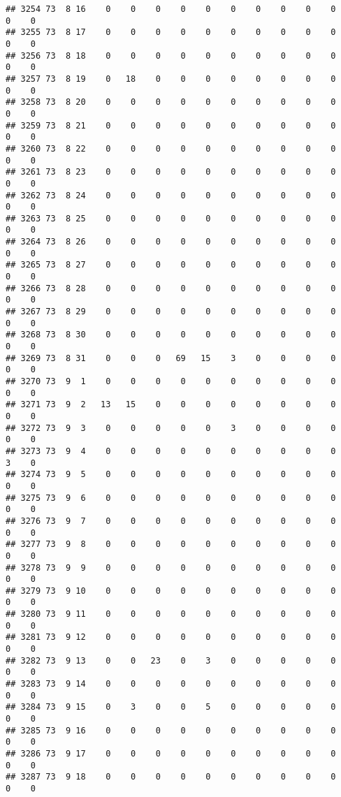 \documentclass[]{article}
\begin{document}
\begin{verbatim}
## 3254 73  8 16    0    0    0    0    0    0    0    0    0    0    0    0
## 3255 73  8 17    0    0    0    0    0    0    0    0    0    0    0    0
## 3256 73  8 18    0    0    0    0    0    0    0    0    0    0    0    0
## 3257 73  8 19    0   18    0    0    0    0    0    0    0    0    0    0
## 3258 73  8 20    0    0    0    0    0    0    0    0    0    0    0    0
## 3259 73  8 21    0    0    0    0    0    0    0    0    0    0    0    0
## 3260 73  8 22    0    0    0    0    0    0    0    0    0    0    0    0
## 3261 73  8 23    0    0    0    0    0    0    0    0    0    0    0    0
## 3262 73  8 24    0    0    0    0    0    0    0    0    0    0    0    0
## 3263 73  8 25    0    0    0    0    0    0    0    0    0    0    0    0
## 3264 73  8 26    0    0    0    0    0    0    0    0    0    0    0    0
## 3265 73  8 27    0    0    0    0    0    0    0    0    0    0    0    0
## 3266 73  8 28    0    0    0    0    0    0    0    0    0    0    0    0
## 3267 73  8 29    0    0    0    0    0    0    0    0    0    0    0    0
## 3268 73  8 30    0    0    0    0    0    0    0    0    0    0    0    0
## 3269 73  8 31    0    0    0   69   15    3    0    0    0    0    0    0
## 3270 73  9  1    0    0    0    0    0    0    0    0    0    0    0    0
## 3271 73  9  2   13   15    0    0    0    0    0    0    0    0    0    0
## 3272 73  9  3    0    0    0    0    0    3    0    0    0    0    0    0
## 3273 73  9  4    0    0    0    0    0    0    0    0    0    0    3    0
## 3274 73  9  5    0    0    0    0    0    0    0    0    0    0    0    0
## 3275 73  9  6    0    0    0    0    0    0    0    0    0    0    0    0
## 3276 73  9  7    0    0    0    0    0    0    0    0    0    0    0    0
## 3277 73  9  8    0    0    0    0    0    0    0    0    0    0    0    0
## 3278 73  9  9    0    0    0    0    0    0    0    0    0    0    0    0
## 3279 73  9 10    0    0    0    0    0    0    0    0    0    0    0    0
## 3280 73  9 11    0    0    0    0    0    0    0    0    0    0    0    0
## 3281 73  9 12    0    0    0    0    0    0    0    0    0    0    0    0
## 3282 73  9 13    0    0   23    0    3    0    0    0    0    0    0    0
## 3283 73  9 14    0    0    0    0    0    0    0    0    0    0    0    0
## 3284 73  9 15    0    3    0    0    5    0    0    0    0    0    0    0
## 3285 73  9 16    0    0    0    0    0    0    0    0    0    0    0    0
## 3286 73  9 17    0    0    0    0    0    0    0    0    0    0    0    0
## 3287 73  9 18    0    0    0    0    0    0    0    0    0    0    0    0

\end{verbatim}
\end{document}
